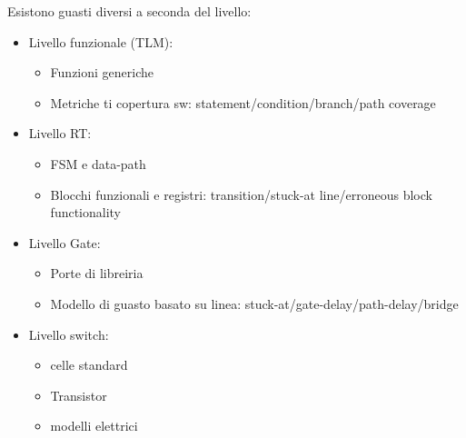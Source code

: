 \documentclass[a4paper]{article}
\theoremstyle{definition}
\begin{document}
			Esistono guasti diversi a seconda del livello:
			\begin{multicols}{2}
				\begin{itemize}
					\item Livello funzionale (TLM):
					\begin{itemize}
						\item Funzioni generiche
						\item Metriche ti copertura sw: statement/condition/branch/path coverage
					\end{itemize}
					\item Livello RT:
					\begin{itemize}
						\item FSM e data-path
						\item Blocchi funzionali e registri: transition/stuck-at line/erroneous block functionality
					\end{itemize}
					\item Livello Gate:
					\begin{itemize}
						\item Porte di libreiria
						\item Modello di guasto basato su linea: stuck-at/gate-delay/path-delay/bridge
					\end{itemize}
					\item Livello switch:
					\begin{itemize}
						\item celle standard
						\item Transistor
						\item modelli elettrici
					\end{itemize}
				\end{itemize}
			\end{multicols}
			
\end{document}
